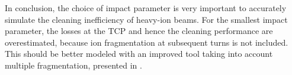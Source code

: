In conclusion, the choice of impact parameter is very important to accurately simulate the cleaning inefficiency of heavy-ion beams. For the smallest impact parameter, the losses at the TCP and hence the cleaning performance are overestimated, because ion fragmentation at subsequent turns is not included. This should be better modeled with an improved tool taking into account multiple fragmentation, presented in .







